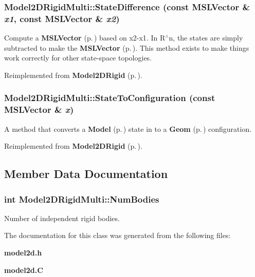 \subsubsection{ Model2DRigid\-Multi::State\-Difference (const {\bf MSLVector} \& {\em x1}, const {\bf MSLVector} \& {\em x2})\hspace{0.3cm}{\tt  [virtual]}}\label{classModel2DRigidMulti_a5}


Compute a {\bf MSLVector} {\rm (p.\,\pageref{classMSLVector})} based on x2-x1. In R$^\wedge$n, the states are simply subtracted to make the {\bf MSLVector} {\rm (p.\,\pageref{classMSLVector})}. This method exists to make things work correctly for other state-space topologies.



Reimplemented from {\bf Model2DRigid} {\rm (p.\,\pageref{classModel2DRigid_a5})}.
\subsubsection{ Model2DRigid\-Multi::State\-To\-Configuration (const {\bf MSLVector} \& {\em x})\hspace{0.3cm}{\tt  [virtual]}}\label{classModel2DRigidMulti_a3}


A method that converts a {\bf Model} {\rm (p.\,\pageref{classModel})} state in to a {\bf Geom} {\rm (p.\,\pageref{classGeom})} configuration.



Reimplemented from {\bf Model2DRigid} {\rm (p.\,\pageref{classModel2DRigid_a7})}.

\subsection{Member Data Documentation}
\subsubsection{\setlength{\rightskip}{0pt plus 5cm}int Model2DRigid\-Multi::Num\-Bodies}\label{classModel2DRigidMulti_m0}


Number of independent rigid bodies.



The documentation for this class was generated from the following files:\begin{CompactItemize}
\item 
{\bf model2d.h}\item 
{\bf model2d.C}\end{CompactItemize}

